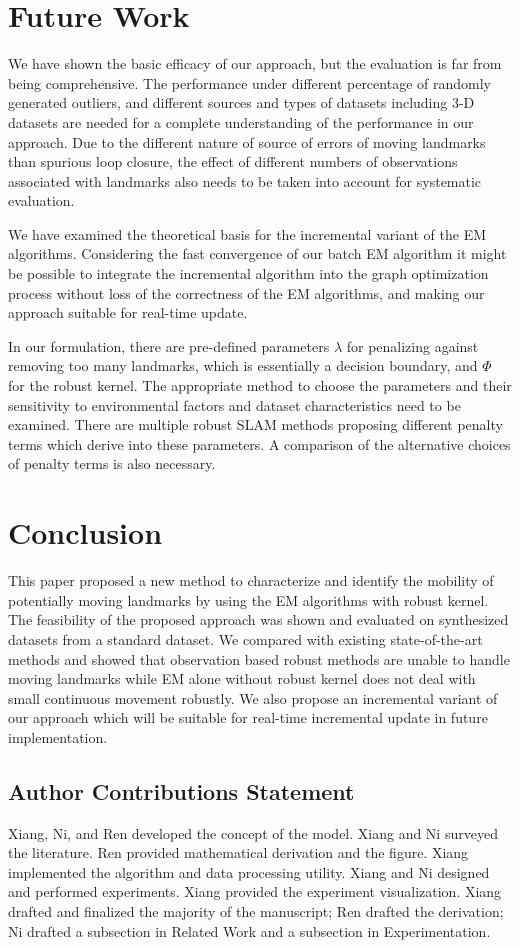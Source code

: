 \section{Future Work}

We have shown the basic efficacy of our approach, but the evaluation is far from being comprehensive. The performance under different percentage of randomly generated outliers, and different sources and types of datasets including 3-D datasets are needed for a complete understanding of the performance in our approach. Due to the different nature of source of errors of moving landmarks than spurious loop closure, the effect of different numbers of observations associated with landmarks also needs to be taken into account for systematic evaluation.

We have examined the theoretical basis for the incremental variant of the EM algorithms. Considering the fast convergence of our batch EM algorithm it might be possible to integrate the incremental algorithm into the graph optimization process without loss of the correctness of the EM algorithms, and making our approach suitable for real-time update.

In our formulation, there are pre-defined parameters $\lambda$ for penalizing against removing too many landmarks, which is essentially a decision boundary, and $\Phi$ for the robust kernel. The appropriate method to choose the parameters and their sensitivity to environmental factors and dataset characteristics need to be examined. There are multiple robust SLAM methods proposing different penalty terms which derive into these parameters. A comparison of the alternative choices of penalty terms is also necessary.

\section{Conclusion}

This paper proposed a new method to characterize and identify the mobility of potentially moving landmarks by using the EM algorithms with robust kernel. The feasibility of the proposed approach was shown and evaluated on synthesized datasets from a standard dataset. We compared with existing state-of-the-art methods and showed that observation based robust methods are unable to handle moving landmarks while EM alone without robust kernel does not deal with small continuous movement robustly. We also propose an incremental variant of our approach which will be suitable for real-time incremental update in future implementation.

\subsection*{Author Contributions Statement}
Xiang, Ni, and Ren developed the concept of the model. Xiang and Ni surveyed the literature. Ren provided mathematical derivation and the figure. Xiang implemented the algorithm and data processing utility. Xiang and Ni designed and performed experiments. Xiang provided the experiment visualization. Xiang drafted and finalized the majority of the manuscript; Ren drafted the derivation; Ni drafted a subsection in Related Work and a subsection in Experimentation.
